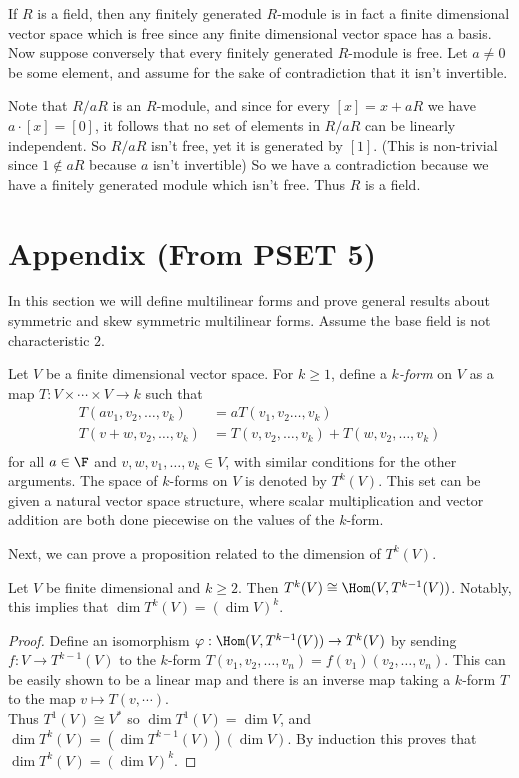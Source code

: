 \documentclass[11pt,letterpaper]{article}
\begin{document}
If $R$ is a field, then any finitely generated $R$-module is in fact a finite dimensional vector space which is free since any finite dimensional vector space has a basis. Now suppose conversely that every finitely generated $R$-module is free. Let $a\neq 0$ be some element, and assume for the sake of contradiction that it isn't invertible. 

Note that $R/aR$ is an $R$-module, and since for every $[x]=x+aR$ we have $a\cdot [x]=[0]$, it follows that no set of elements in $R/aR$ can be linearly independent. So $R/aR$ isn't free, yet it is generated by $[1]$. (This is non-trivial since $1\not\in aR$ because $a$ isn't invertible) So we have a contradiction because we have a finitely generated module which isn't free. Thus $R$ is a field.     

\pagebreak
\appendix
\section{Appendix (From PSET 5)}
In this section we will define multilinear forms and prove general results about symmetric and skew symmetric multilinear forms. Assume the base field is not characteristic $2$.
\begin{definition}\label{kform}
  Let $V$ be a finite dimensional vector space. For $k\geq 1$, define a {\em $k$-form} on $V$ as a map $T : V\times\cdots\times V \to k$ such that
  \[
    \begin{aligned}
      T(av_1,v_2,\ldots,v_k) &= aT(v_1,v_2\ldots,v_k)\\
      T(v+w,v_2,\ldots,v_k) &= T(v,v_2,\ldots,v_k) + T(w,v_2,\ldots,v_k)\\
    \end{aligned} 
  \]
  for all $a\in \F$ and $v,w,v_1,\ldots,v_k\in V$, with similar conditions for the other arguments. The space of $k$-forms on $V$ is denoted by $T^k(V)$. This set can be given a natural vector space structure, where scalar multiplication and vector addition are both done piecewise on the values of the $k$-form.
\end{definition}

Next, we can prove a proposition related to the dimension of $T^k(V)$.
\begin{proposition}\label{dimension}
  Let $V$ be finite dimensional and $k\geq 2$. Then $T^k(V)\cong \Hom(V, T^{k-1}(V))$. Notably, this implies that $\dim T^k(V) = \left(\dim V\right)^k$.   
\end{proposition}
\begin{proof}
  Define an isomorphism $\varphi : \Hom(V, T^{k-1}(V)) \to T^k(V)$ by sending $f : V \to T^{k-1}(V)$ to the $k$-form $T(v_1,v_2,\ldots,v_n) = f(v_1)(v_2,\ldots,v_n)$. This can be easily shown to be a linear map and there is an inverse map taking a $k$-form $T$ to the map $v \mapsto T(v,\cdots)$.\\

  Thus $T^1(V)\cong V^*$ so $\dim T^1(V) = \dim V$, and $\dim T^k(V) = (\dim T^{k-1}(V))(\dim V)$. By induction this proves that $\dim T^k(V)=\left(\dim V\right)^k$.  
\end{proof}
\end{document}
